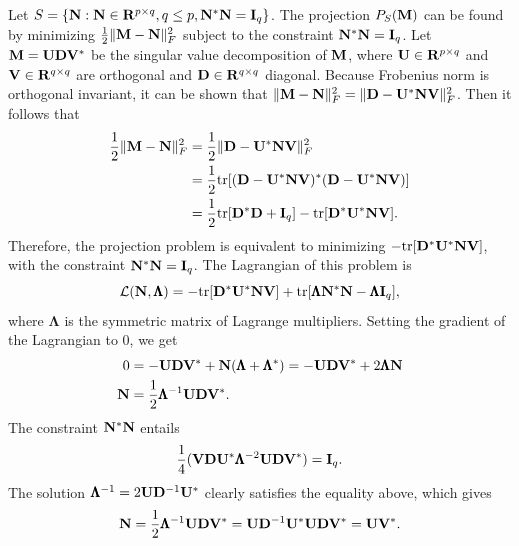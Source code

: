 \documentclass{scrartcl}
\begin{document}
Let $S = \{\mathbf{N} : \mathbf{N} \in \mathbf{R}^{p \times q}, q \le p, \mathbf{N}^*\mathbf{N} = \mathbf{I}_q\}$. The projection $P_{S}(\mathbf{M})$
can be found by minimizing ${1 \over 2} \|\mathbf{M} - \mathbf{N}\|_F^2$ subject to the constraint $\mathbf{N}^*\mathbf{N} = \mathbf{I}_q$.
Let $\mathbf{M} = \mathbf{U}\mathbf{D}\mathbf{V}^*$ be the singular value decomposition of $\mathbf{M}$, where $\mathbf{U} \in \mathbf{R}^{p \times q}$
and $\mathbf{V} \in \mathbf{R}^{q \times q}$ are orthogonal and $\mathbf{D} \in \mathbf{R}^{q \times q}$ diagonal. Because Frobenius norm is orthogonal invariant,
it can be shown that $\|\mathbf{M}-\mathbf{N}\|_F^2 = \|\mathbf{D}-\mathbf{U}^*\mathbf{N}\mathbf{V}\|_F^2$. Then it follows that
\begin{equation}
\begin{split}
{1 \over 2} \|\mathbf{M} - \mathbf{N}\|_F^2 
& = {1 \over 2} \|\mathbf{D}-\mathbf{U}^*\mathbf{N}\mathbf{V}\|_F^2 \\
& = {1 \over 2} \mathrm{tr} [ (\mathbf{D}-\mathbf{U}^*\mathbf{N}\mathbf{V})^*(\mathbf{D}-\mathbf{U}^*\mathbf{N}\mathbf{V}) ] \\
& = {1 \over 2} \mathrm{tr} [\mathbf{D}^*\mathbf{D} + \mathbf{I}_q] - \mathrm{tr}[\mathbf{D}^*\mathbf{U}^*\mathbf{N}\mathbf{V}] .
\end{split}
\end{equation}
Therefore, the projection problem is equivalent to minimizing $-\mathrm{tr}[\mathbf{D}^*\mathbf{U}^*\mathbf{N}\mathbf{V}]$,
with the constraint $\mathbf{N}^*\mathbf{N} = \mathbf{I}_q$. The Lagrangian of this problem is
\begin{equation}
\mathcal{L}(\mathbf{N}, \pmb{\Lambda})
= -\mathrm{tr}[\mathbf{D}^*\mathbf{U}^*\mathbf{N}\mathbf{V}] + \mathrm{tr}[\pmb{\Lambda} \mathbf{N}^*\mathbf{N} - \pmb{\Lambda}\mathbf{I}_q],
\end{equation}
where $\pmb{\Lambda}$ is the symmetric matrix of Lagrange multipliers.
Setting the gradient of the Lagrangian to 0, we get
\begin{equation}
\begin{split}
0 & = -\mathbf{U} \mathbf{D} \mathbf{V}^* + \mathbf{N} (\pmb{\Lambda} + \pmb{\Lambda}^*)
  = -\mathbf{U} \mathbf{D} \mathbf{V}^* + 2 \pmb{\Lambda} \mathbf{N} \\
\mathbf{N} & = {1 \over 2} \pmb{\Lambda}^{-1} \mathbf{U} \mathbf{D} \mathbf{V}^*.
\end{split}
\end{equation}
The constraint $\mathbf{N}^*\mathbf{N}$ entails
\begin{equation}
{1 \over 4} (\mathbf{V} \mathbf{D} \mathbf{U}^* \pmb{\Lambda}^{-2} \mathbf{U} \mathbf{D} \mathbf{V}^*) = \mathbf{I}_q.
\end{equation}
The solution $\pmb{\Lambda}^{-1} = 2 \mathbf{U} \mathbf{D}^{-1} \mathbf{U}^*$ clearly satisfies the equality above, which gives
\begin{equation}
\mathbf{N} = {1 \over 2} \pmb{\Lambda}^{-1} \mathbf{U} \mathbf{D} \mathbf{V}^* 
= \mathbf{U} \mathbf{D}^{-1} \mathbf{U}^* \mathbf{U} \mathbf{D} \mathbf{V}^* = \mathbf{U} \mathbf{V}^*.
\end{equation}
\end{document}
